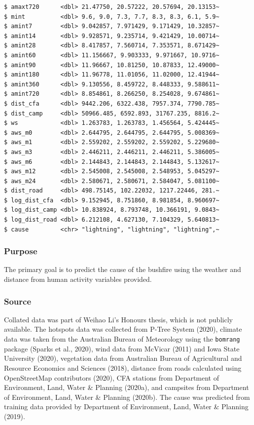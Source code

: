 \documentclass[
  letterpaper,
]{krantz}
\begin{document}
\begin{verbatim}
$ amaxt720      <dbl> 21.47750, 20.57222, 20.57694, 20.13153~
$ mint          <dbl> 9.6, 9.0, 7.3, 7.7, 8.3, 8.3, 6.1, 5.9~
$ amint7        <dbl> 9.042857, 7.971429, 9.171429, 10.32857~
$ amint14       <dbl> 9.928571, 9.235714, 9.421429, 10.00714~
$ amint28       <dbl> 8.417857, 7.560714, 7.353571, 8.671429~
$ amint60       <dbl> 11.156667, 9.903333, 9.971667, 10.9716~
$ amint90       <dbl> 11.96667, 10.81250, 10.87833, 12.49000~
$ amint180      <dbl> 11.96778, 11.01056, 11.02000, 12.41944~
$ amint360      <dbl> 9.130556, 8.459722, 8.448333, 9.588611~
$ amint720      <dbl> 8.854861, 8.266250, 8.254028, 9.674861~
$ dist_cfa      <dbl> 9442.206, 6322.438, 7957.374, 7790.785~
$ dist_camp     <dbl> 50966.485, 6592.893, 31767.235, 8816.2~
$ ws            <dbl> 1.263783, 1.263783, 1.456564, 5.424445~
$ aws_m0        <dbl> 2.644795, 2.644795, 2.644795, 5.008369~
$ aws_m1        <dbl> 2.559202, 2.559202, 2.559202, 5.229680~
$ aws_m3        <dbl> 2.446211, 2.446211, 2.446211, 5.386005~
$ aws_m6        <dbl> 2.144843, 2.144843, 2.144843, 5.132617~
$ aws_m12       <dbl> 2.545008, 2.545008, 2.548953, 5.045297~
$ aws_m24       <dbl> 2.580671, 2.580671, 2.584047, 5.081100~
$ dist_road     <dbl> 498.75145, 102.22032, 1217.22446, 281.~
$ log_dist_cfa  <dbl> 9.152945, 8.751860, 8.981854, 8.960697~
$ log_dist_camp <dbl> 10.838924, 8.793748, 10.366191, 9.0843~
$ log_dist_road <dbl> 6.212108, 4.627130, 7.104329, 5.640813~
$ cause         <chr> "lightning", "lightning", "lightning",~
\end{verbatim}

\subsubsection*{Purpose}\label{purpose-1}

The primary goal is to predict the cause of the bushfire using the
weather and distance from human activity variables provided.

\subsubsection*{Source}\label{source-1}

Collated data was part of Weihao Li's Honours thesis, which is not
publicly available. The hotspots data was collected from P-Tree System
(2020), climate data was taken from the Australian Bureau of Meteorology
using the \texttt{bomrang} package (Sparks et al., 2020), wind data from
McVicar (2011) and Iowa State University (2020), vegetation data from
Australian Bureau of Agricultural and Resource Economics and Sciences
(2018), distance from roads calculated using OpenStreetMap contributors
(2020), CFA stations from Department of Environment, Land, Water \&
Planning (2020a), and campsites from Department of Environment, Land,
Water \& Planning (2020b). The cause was predicted from training data
provided by Department of Environment, Land, Water \& Planning (2019).
\end{document}
